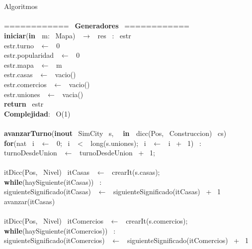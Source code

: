 \noindent \\
\\
Algoritmos\\
\\
============ \ \textbf{Generadores} \ ============ \ \\
\noindent\makebox[\linewidth]{\rule{\textwidth}{0.4pt}}
\textbf{iniciar}(\textbf{in \ }m: \ Mapa) \ $\longrightarrow$ \ res \ : \ estr\\
\indent estr.turno \ $\leftarrow$ \ 0\\
\indent estr.popularidad \ $\leftarrow$ \ 0\\
\indent estr.mapa \ $\leftarrow$ \ m\\
\indent estr.casas \ $\leftarrow$ \ vacio()\\
\indent estr.comercios \ $\leftarrow$ \ vacio()\\
\indent estr.uniones \ $\leftarrow$ \ vacia()\\
\indent \textbf{return} \ estr\\
\textbf{Complejidad}: \ O(1)\\
\noindent\makebox[\linewidth]{\rule{\textwidth}{0.4pt}}
\\
\noindent\makebox[\linewidth]{\rule{\textwidth}{0.4pt}}
\textbf{avanzarTurno}(\textbf{inout} \ SimCity \ s, \  \ \textbf{in \ }dicc(Pos, \ Construccion) \ cs)\\
\indent 
\indent \textbf{for}(nat \ i \ $\leftarrow$ \ 0; \ i \ $<$ \ long(s.uniones); \ i \ $\leftarrow$ \ i \ + \ 1) \ : \ \\
\indent \indent turnoDesdeUnion \ $\leftarrow$ \ turnoDesdeUnion \ + \ 1;\\
\\
\indent 
\indent itDicc(Pos, \ Nivel) \ itCasas \ $\leftarrow$ \ crearIt(s.casas);\\
\indent \textbf{while}(haySiguiente(itCasas)) \ :\\
\indent \indent siguienteSignificado(itCasas) \ $\leftarrow$ \ siguienteSignificado(itCasas) \ + \ 1\\
\indent \indent avanzar(itCasas)\\
\\
\indent 
\indent itDicc(Pos, \ Nivel) \ itComercios \ $\leftarrow$ \ crearIt(s.comercios);\\
\indent \textbf{while}(haySiguiente(itComercios)) \ :\\
\indent \indent siguienteSignificado(itComercios) \ $\leftarrow$ \ siguienteSignificado(itComercios) \ + \ 1\\
